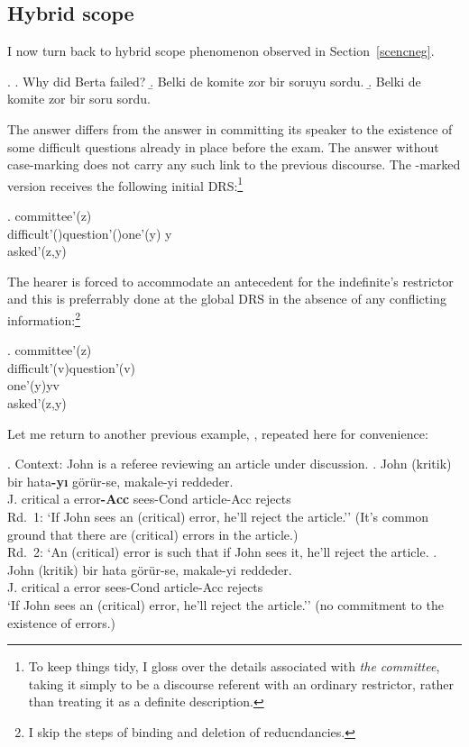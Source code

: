 \documentclass[11pt,a4paper]{article}
\begin{document}
\subsection{Hybrid scope}
\label{schybrid}

I now turn back to hybrid scope phenomenon observed in
Section~\ref{scencneg}. 

\ex.\label{exsorudia}
\a. Why did Berta failed?
\b. \label{exsorudiaa}
Belki de komite zor bir soruyu sordu.
\b. \label{exsorudiaz}%
Belki de komite zor bir soru sordu.


The answer  differs from the answer 
in committing its speaker to the existence of some difficult questions
already in place before the exam. The answer  without
case-marking does not carry any such link to the previous discourse.
The \acc-marked version  receives the following
initial DRS:\footnote{To keep things tidy, I gloss over the details
associated with \emph{the committee}, taking it simply to be a
discourse referent with an ordinary restrictor, rather than treating
it as a definite description.}

\ex.
{
		committee'(z)\\
{
difficult'()\quad question'()\quad one'(y)\quad
y\subseteq {}\\
asked'(z,y)
}
}

The hearer is forced to accommodate an antecedent for the indefinite's
restrictor and this is preferrably done at the global DRS in the
absence of any conflicting information:\footnote{I skip the steps of
binding and deletion of reducndancies.}

\ex.
{
		committee'(z)\\
		difficult'(v)\quad question'(v)\\
{
one'(y)\quad y\subseteq v\\
asked'(z,y)
}
}

Let me return to another previous example, , repeated
here for convenience:

\ex.\label{excondr}%
Context: John is a referee reviewing an article under discussion.
\ag.\label{excondar}%
	John (kritik) bir hata{\bf-yı} görür-se, makale-yi reddeder.\\
	J. critical a error{\bf-Acc} sees-Cond article-Acc rejects\\
	Rd.\ 1: `If John sees an (critical) error, he'll reject the article.'' (It's
	common ground that there are (critical) errors in the article.)\\
	Rd.\ 2: `An (critical) error is such that if John sees it, he'll reject the
	article.
\bg.\label{excondzr}%
	John (kritik) bir hata görür-se, makale-yi reddeder.\\
	J. critical a error sees-Cond article-Acc rejects\\
	`If John sees an (critical) error, he'll reject the article.'' (no commitment
	to the existence of errors.)
\end{document}
